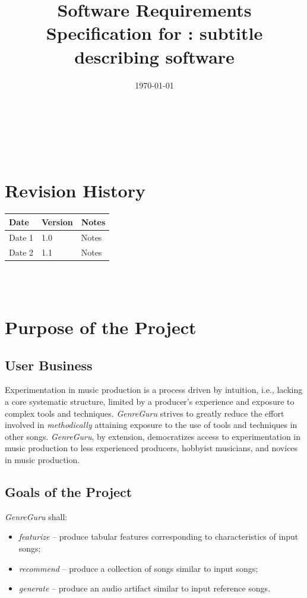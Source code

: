 \documentclass[12pt]{article}
\begin{document}
\title{Software Requirements Specification for \progname: subtitle describing software} 
\author{\authname}
\date{\today}
	
\maketitle

~\newpage


\tableofcontents

~\newpage

\section*{Revision History}

\begin{tabularx}{\textwidth}{p{3cm}p{2cm}X}
\toprule {\textbf{Date}} & {\textbf{Version}} & {\textbf{Notes}}\\
\midrule
Date 1 & 1.0 & Notes\\
Date 2 & 1.1 & Notes\\
\bottomrule
\end{tabularx}

~\\

~\newpage
\section{Purpose of the Project}
\subsection{User Business}
Experimentation in music production is a process driven by intuition, i.e., lacking a core systematic structure, limited by a producer's experience and exposure to complex tools and techniques. \emph{GenreGuru} strives to greatly reduce the effort involved in \emph{methodically} attaining exposure to the use of tools and techniques in other songs. \emph{GenreGuru}, by extension, democratizes access to experimentation in music production to less experienced producers, hobbyist musicians, and novices in music production.
\subsection{Goals of the Project}
\emph{GenreGuru} shall:
\begin{itemize}
  \item \emph{featurize} -- produce tabular features corresponding to characteristics of input songs;
  \item \emph{recommend} -- produce a collection of songs similar to input songs;
  \item \emph{generate} -- produce an audio artifact similar to input reference songs.
\end{itemize}
\end{document}
